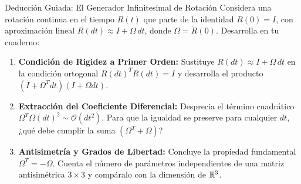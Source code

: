 \documentclass[10pt,aspectratio=169]{beamer}
\begin{document}
\begin{frame}{Deducción Guiada: El Generador Infinitesimal de Rotación}
  \vspace{0.05cm}
  Considera una rotación continua en el tiempo $R(t)$ que parte de la identidad $R(0) = I$, con aproximación lineal $R(dt) \approx I + \Omega\, dt$, donde $\Omega = \dot{R}(0)$. Desarrolla en tu cuaderno:
  \vspace{0.22cm}
  \begin{enumerate}\itemsep10pt
    \item[(a)] \textbf{Condición de Rigidez a Primer Orden:} Sustituye $R(dt) \approx I + \Omega\, dt$ en la condición ortogonal $R(dt)^T R(dt) = I$ y desarrolla el producto $(I + \Omega^T dt)(I + \Omega dt)$.
    \item[(b)] \textbf{Extracción del Coeficiente Diferencial:} Desprecia el término cuadrático $\Omega^T \Omega (dt)^2 \sim \mathcal{O}(dt^2)$. Para que la igualdad se preserve para cualquier $dt$, ¿qué debe cumplir la suma $(\Omega^T + \Omega)$?
    \item[(c)] \textbf{Antisimetría y Grados de Libertad:} Concluye la propiedad fundamental $\Omega^T = -\Omega$. Cuenta el número de parámetros independientes de una matriz antisimétrica $3 \times 3$ y compáralo con la dimensión de $\mathbb{R}^3$.
  \end{enumerate}
\end{frame}
\end{document}
